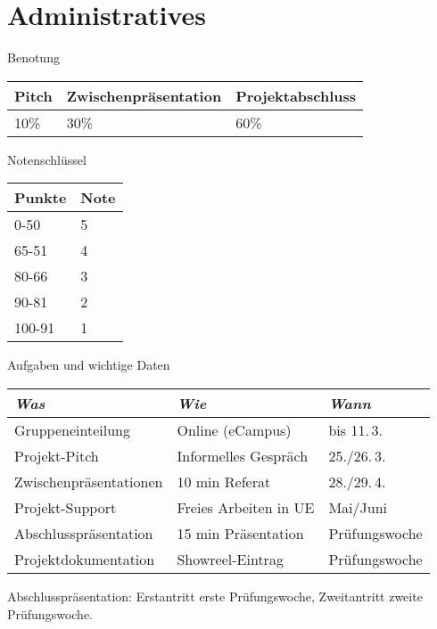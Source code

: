 
\section{Administratives}
 \frame{\sectionpage}

\begin{frame}{Benotung}

 
\begin{table}[]
\begin{tabular}{l|l|l}
Pitch & Zwischenpräsentation & Projektabschluss \\ \hline
10\%  & 30\%                & 60\%       
\end{tabular}
\end{table}



\end{frame}


\begin{frame}{Notenschlüssel}


 
\begin{table}[]
\begin{tabular}{l|l}
Punkte & Note \\ \hline
0-50   & 5    \\
65-51  & 4    \\
80-66  & 3    \\
90-81  & 2    \\
100-91 & 1   
\end{tabular}
\end{table}

\end{frame}


\begin{frame}{Aufgaben und wichtige Daten}
\begin{table}[]
\begin{tabular}{l|l|l}
\emph{Was}             &  \emph{Wie}           & \emph{Wann}	\\ \hline
Gruppeneinteilung      & Online (eCampus)      & bis 11.\,3.   \\
Projekt-Pitch          & Informelles Gespräch  & 25./26.\,3.	\\
Zwischenpräsentationen & 10 min Referat        & 28./29.\,4.	\\
Projekt-Support        & Freies Arbeiten in UE & Mai/Juni	\\
Abschlusspräsentation  & 15 min Präsentation   & Prüfungswoche \\
Projektdokumentation   & Showreel-Eintrag      & Prüfungswoche
\end{tabular}
\end{table}

Abschlusspräsentation: Erstantritt erste Prüfungswoche, Zweitantritt zweite Prüfungswoche.

\end{frame}



